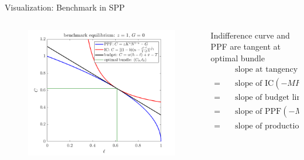 \documentclass[11pt,aspectratio=169,usenames,dvipsnames]{beamer}
\begin{document}
\begin{frame}{Visualization: Benchmark in SPP}
\label{slide:Visualization__Benchmark_in_SPP}
    \begin{columns}
        \begin{column}{0.5\textwidth}
            \begin{figure}
                \includegraphics[width=\textwidth]{./figures/benchmark.png}
            \end{figure}
        \end{column}
        \begin{column}{0.5\textwidth}
            Indifference curve and PPF are tangent at optimal bundle
            \begin{align*}
                    & \text{slope at tangency } ( C_{0}, l_{0} )
                \\
                = \quad
                    & \text{slope of IC} (-MRS_{l, C})
                \\
                = \quad
                    & \text{slope of budget line} (-w)
                \\
                = \quad
                    & \text{slope of PPF} (-MRT_{l, C})
                \\
                = \quad
                    & \text{slope of production fcn} (-MPN)
            \end{align*}
        \end{column}
    \end{columns}
\end{frame}
\end{document}
